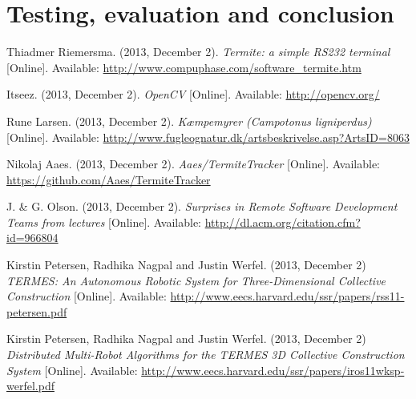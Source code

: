 \documentclass[oribibl]{llncs}
\begin{document}
\section{Testing, evaluation and conclusion}















%

\begin{thebibliography}{9}
    
		 Thiadmer Riemersma. (2013, December 2). \textit{Termite: a simple RS232 terminal} [Online]. Available: \url{http://www.compuphase.com/software_termite.htm}
        
         Itseez. (2013, December 2). \textit{OpenCV} [Online]. Available: \url{http://opencv.org/}
        
         Rune Larsen. (2013, December 2). \textit{Kæmpemyrer (Campotonus ligniperdus)} [Online]. Available: \url{http://www.fugleognatur.dk/artsbeskrivelse.asp?ArtsID=8063}
        
         Nikolaj Aaes. (2013, December 2). \textit{Aaes/TermiteTracker} [Online]. Available: \url{https://github.com/Aaes/TermiteTracker}
        
		 J. \& G. Olson. (2013, December 2). \textit{Surprises in Remote Software Development Teams from lectures} [Online]. Available: \url{http://dl.acm.org/citation.cfm?id=966804}
        
         Kirstin Petersen, Radhika Nagpal and Justin Werfel. (2013, December 2) \textit{TERMES: An Autonomous Robotic System for Three-Dimensional Collective Construction} [Online]. Available: \url{http://www.eecs.harvard.edu/ssr/papers/rss11-petersen.pdf}
        
         Kirstin Petersen, Radhika Nagpal and Justin Werfel. (2013, December 2) \textit{Distributed Multi-Robot Algorithms for the TERMES 3D Collective Construction System} [Online]. Available: \url{http://www.eecs.harvard.edu/ssr/papers/iros11wksp-werfel.pdf}
        
\end{thebibliography}


\end{document}

